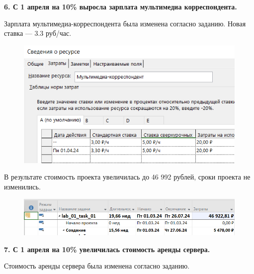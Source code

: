 \textbf{6. С 1 апреля на 10\% выросла зарплата мультимедиа корреспондента.}

Зарплата мультимедиа-корреспондента была изменена согласно заданию. Новая ставка --- 3.3 руб/час.

\begin{figure}[h!]
	\begin{center}
		\includegraphics[scale=0.7]{inc/img/p_18.png}
	\end{center}
	\captionsetup{justification=centering}
	\label{fig:u3}
\end{figure}

В результате стоимость проекта увеличилась до 46 992 рублей, сроки проекта не изменились.

\begin{figure}[h!]
	\begin{center}
		\includegraphics[scale=0.7]{inc/img/p_19.png}
	\end{center}
	\captionsetup{justification=centering}
	\label{fig:u3}
\end{figure}

\textbf{7. С 1 апреля на 10\% увеличилась стоимость аренды сервера.}

Стоимость аренды сервера была изменена согласно заданию.

